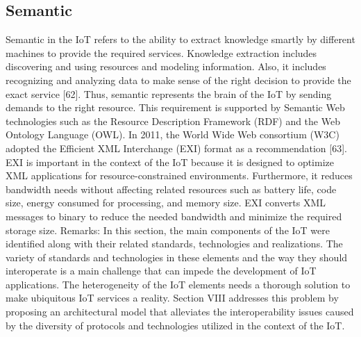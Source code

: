 \subsection{Semantic}
Semantic in the IoT refers to the ability to extract knowledge
smartly by different machines to provide the required services.
Knowledge extraction includes discovering and using resources
and modeling information. Also, it includes recognizing and
analyzing data to make sense of the right decision to provide
the exact service [62]. Thus, semantic represents the brain of the
IoT by sending demands to the right resource. This requirement
is supported by Semantic Web technologies such as the Resource
Description Framework (RDF) and the Web Ontology
Language (OWL). In 2011, the World Wide Web consortium
(W3C) adopted the Efficient XML Interchange (EXI) format as
a recommendation [63].
EXI is important in the context of the IoT because it is designed
to optimize XML applications for resource-constrained
environments. Furthermore, it reduces bandwidth needs without
affecting related resources such as battery life, code size,
energy consumed for processing, and memory size. EXI converts
XML messages to binary to reduce the needed bandwidth
and minimize the required storage size.
Remarks: In this section, the main components of the IoT
were identified along with their related standards, technologies
and realizations. The variety of standards and technologies in
these elements and the way they should interoperate is a main
challenge that can impede the development of IoT applications.
The heterogeneity of the IoT elements needs a thorough solution
to make ubiquitous IoT services a reality. Section VIII
addresses this problem by proposing an architectural model that
alleviates the interoperability issues caused by the diversity of
protocols and technologies utilized in the context of the IoT.

